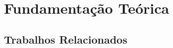\chapter[Fundamentação Teórica]{Fundamentação Teórica}
\label{cap-fundamentacao_teorica}

\section{Trabalhos Relacionados}
\label{section:trabalhos_relacionados}

